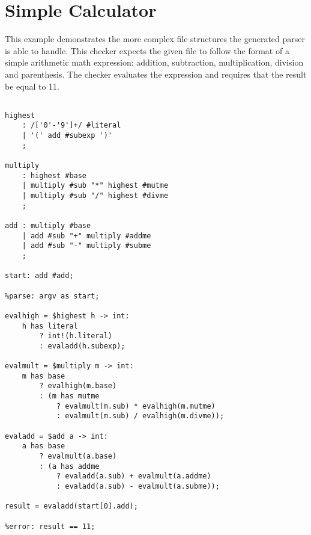 
\section{Simple Calculator}
{

This example demonstrates the more complex file structures the generated
parser is able to handle. This checker expects the given file to follow
the format of a simple arithmetic math expression: addition, subtraction,
multiplication, division and parenthesis. The checker evaluates the expression
and requires that the result be equal to 11.

\begin{lstlisting}[texcl=true, language=MAIA]
%skip: ' ' | '\n';

highest
	: /['0'-'9']+/ #literal
	| '(' add #subexp ')'
	;

multiply
	: highest #base
	| multiply #sub "*" highest #mutme
	| multiply #sub "/" highest #divme
	;

add	: multiply #base
	| add #sub "+" multiply #addme
	| add #sub "-" multiply #subme
	;

start: add #add;

%parse: argv as start;

evalhigh = $highest h -> int:
	h has literal
		? int!(h.literal)
		: evaladd(h.subexp);

evalmult = $multiply m -> int:
	m has base
		? evalhigh(m.base)
		: (m has mutme
			? evalmult(m.sub) * evalhigh(m.mutme)
			: evalmult(m.sub) / evalhigh(m.divme));

evaladd = $add a -> int:
	a has base
		? evalmult(a.base)
		: (a has addme
			? evaladd(a.sub) + evalmult(a.addme)
			: evaladd(a.sub) - evalmult(a.subme));

result = evaladd(start[0].add);

%error: result == 11;
\end{lstlisting}
}










